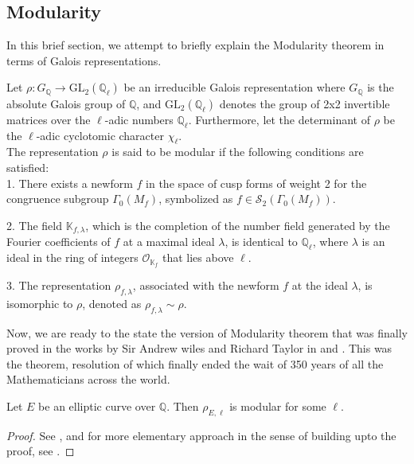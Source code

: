 \subsection{Modularity}
In this brief section, we attempt to briefly explain the Modularity theorem in terms of Galois representations. 

\begin{definition}

Let \( \rho: G_{\mathbb{Q}} \to \mathrm{GL}_{2}(\mathbb{Q}_{\ell}) \) be an irreducible Galois representation where \( G_{\mathbb{Q}} \) is the absolute Galois group of \( \mathbb{Q} \), and \( \mathrm{GL}_{2}(\mathbb{Q}_{\ell}) \) denotes the group of 2x2 invertible matrices over the \( \ell \)-adic numbers \( \mathbb{Q}_{\ell} \). Furthermore, let the determinant of \( \rho \) be the \( \ell \)-adic cyclotomic character \( \chi_{\ell} \). \\

The representation \( \rho \) is said to be modular if the following conditions are satisfied: \\

1. There exists a newform \( f \) in the space of cusp forms of weight 2 for the congruence subgroup \( \Gamma_{0}(M_{f}) \), symbolized as \( f \in \mathcal{S}_{2}(\Gamma_{0}(M_{f})) \).

2. The field \( \mathbb{K}_{f, \lambda} \), which is the completion of the number field generated by the Fourier coefficients of \( f \) at a maximal ideal \( \lambda \), is identical to \( \mathbb{Q}_{\ell} \), where \( \lambda \) is an ideal in the ring of integers \( \mathcal{O}_{\mathbb{K}_{f}} \) that lies above \( \ell \).

3. The representation \( \rho_{f, \lambda} \), associated with the newform \( f \) at the ideal \( \lambda \), is isomorphic to \( \rho \), denoted as \( \rho_{f, \lambda} \sim \rho \).

\end{definition}

Now, we are ready to the state the version of Modularity theorem that was finally proved in the works by Sir Andrew wiles and Richard Taylor in \cite{wiles1995} and \cite{taylorwiles1995b}. This was the theorem, resolution of which finally ended the wait of 350 years of all the Mathematicians across the world. 

\begin{theorem}
Let $E$ be an elliptic curve over $\mathbb{Q}$. Then $\rho_{E, \ell}$ is modular for some $\ell$. \end{theorem}
\begin{proof}
    See \cite{taylorwiles1995b}, \cite{wiles1995elliptic} and for more elementary approach in the sense of building upto the proof, see \cite{darmon1995fermat}.
\end{proof}
